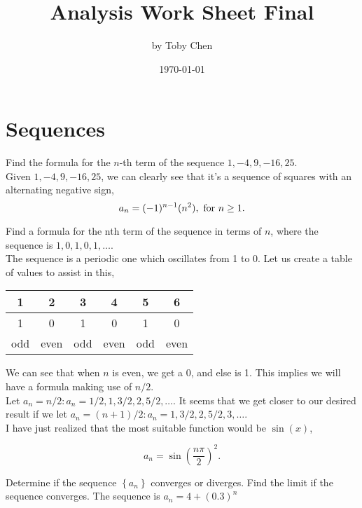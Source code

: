 \documentclass{article}
\title{Analysis Work Sheet Final}
\author{by Toby Chen}
\date{\today}
\begin{document}
    \maketitle

    \tableofcontents

    \section{Sequences}
            Find the formula for the $n$-th term of the sequence $1, -4, 9, -16, 25$.\\
            
            \ans Given $1, -4, 9, -16, 25$, we can clearly see that it's a sequence of squares with an alternating negative sign,\\

            \[a_n = (-1)^{n - 1}(n^2),\text{ for } n\geq 1.\]

            Find a formula for the nth term of the sequence in terms of $n$, where the sequence is $1,0,1,0,1,\dots$.\\

            \ans The sequence is a periodic one which oscillates from 1 to 0. Let us create a table of values to assist in this,

            \begin{center}
                \begin{tabular}{|c|c|c|c|c|c|}
                    \hline
                    1 & 2 & 3 & 4 & 5 & 6 \\
                    \hline
                    1 & 0 & 1 & 0 & 1 & 0 \\
                    \hline
                    odd & even & odd & even & odd & even\\
                    \hline
                \end{tabular}
            \end{center}

            We can see that when $n$ is even, we get a 0, and else is 1. This implies we will have a formula making use of $n/2$.\\

            Let $a_n = n/2 : a_n = 1/2, 1, 3/2, 2, 5/2, \dots$. It seems that we get closer to our desired result if we let $a_n = (n+1)/2 : a_n = 1, 3/2, 2, 5/2, 3, \dots$.\\

            I have just realized that the most suitable function would be $\sin(x)$, 

            \[a_n = \sin\left( \frac{n\pi}{2} \right)^2.\]

        Determine if the sequence $\left\{ a_n \right\}$ converges or diverges. Find the limit if the sequence converges. The sequence is $a_n = 4 + (0.3)^n$\\

        \ans 

        \begin{align*}
            &\\
        \end{align*}
\end{document}
